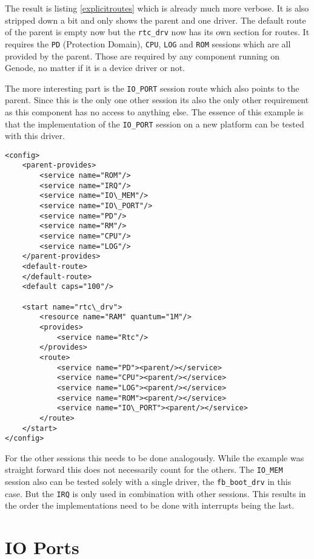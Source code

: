 \documentclass[
a4paper,
12pt,
notitlepage,
parskip=half,
DIV=11,
]{scrbook}
\begin{document}
		The result is listing \ref{explicitroutes} which is already much more verbose.
		It is also stripped down a bit and only shows the parent and one driver.
		The default route of the parent is empty now but the \texttt{rtc\_drv} now has its own section for routes.
		It requires the \texttt{PD} (Protection Domain), \texttt{CPU}, \texttt{LOG} and \texttt{ROM} sessions which are all provided by the parent.
		Those are required by any component running on Genode, no matter if it is a device driver or not.
		
		The more interesting part is the \texttt{IO\_PORT} session route which also points to the parent.
		Since this is the only one other session its also the only other requirement as this component has no access to anything else.
		The essence of this example is that the implementation of the \texttt{IO\_PORT} session on a new platform can be tested with this driver.

		\begin{lstlisting}
<config>
	<parent-provides>
		<service name="ROM"/>
		<service name="IRQ"/>
		<service name="IO\_MEM"/>
		<service name="IO\_PORT"/>
		<service name="PD"/>
		<service name="RM"/>
		<service name="CPU"/>
		<service name="LOG"/>
	</parent-provides>
	<default-route>
	</default-route>
	<default caps="100"/>
		
	<start name="rtc\_drv">
		<resource name="RAM" quantum="1M"/>
		<provides>
			<service name="Rtc"/>
		</provides>
		<route>
			<service name="PD"><parent/></service>
			<service name="CPU"><parent/></service>
			<service name="LOG"><parent/></service>
			<service name="ROM"><parent/></service>
			<service name="IO\_PORT"><parent/></service>
		</route>
	</start>
</config>
		\end{lstlisting}
		
		For the other sessions this needs to be done analogously.
		While the example was straight forward this does not necessarily count for the others.
		The \texttt{IO\_MEM} session also can be tested solely with a single driver, the \texttt{fb\_boot\_drv} in this case.
		But the \texttt{IRQ} is only used in combination with other sessions.
		This results in the order the implementations need to be done with interrupts being the last.
		
		\section{IO Ports}
		
\end{document}

